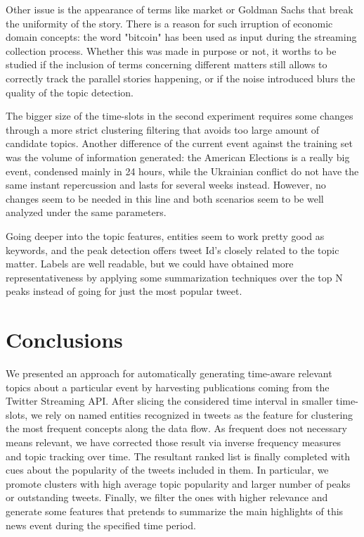 \documentclass{sig-alternate}
\begin{document}
Other issue is the appearance of terms like market or Goldman Sachs that break the uniformity of the story. There is a reason for such irruption of economic domain concepts: the word "bitcoin" has been used as input during the streaming collection process. Whether this was made in purpose or not, it worths to be studied if the inclusion of terms concerning different matters still allows to correctly track the parallel stories happening, or if the noise introduced blurs the quality of the topic detection. 

The bigger size of the time-slots in the second experiment requires some changes through a more strict clustering filtering that avoids too large amount of candidate topics. Another difference of the current event against the training set was the volume of information generated: the American Elections is a really big event, condensed mainly in 24 hours, while the Ukrainian conflict do not have the same instant repercussion and lasts for several weeks instead. However, no changes seem to be needed in this line and both scenarios seem to be well analyzed under the same parameters. 

Going deeper into the topic features, entities seem to work pretty good as keywords, and the peak detection offers tweet Id's closely related to the topic matter. Labels are well readable, but we could have obtained more representativeness by applying some summarization techniques over the top N peaks instead of going for just the most popular tweet.



\section{Conclusions}
We presented an approach for automatically generating time-aware relevant topics about a particular event by harvesting publications coming from the Twitter Streaming API. After slicing the considered time interval in smaller time-slots, we rely on named entities recognized in tweets as the feature for clustering the most frequent concepts along the data flow. As frequent does not necessary means relevant, we have corrected those result via inverse frequency measures and topic tracking over time. The resultant ranked list is finally completed with cues about the popularity of the tweets included in them. In particular, we promote clusters with high average topic popularity and larger number of peaks or outstanding tweets. Finally, we filter the ones with higher relevance and generate some features that pretends to summarize the main highlights of this news event during the specified time period.
\end{document}
